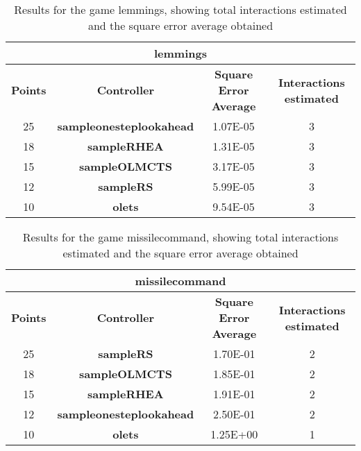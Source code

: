 \begin{table*}[!t]
\begin{center}
\begin{adjustbox}{width=1\textwidth}
\begin{tabular}{|c|c|c|c|}
\hline
\multicolumn{4}{|c|}{\textbf{lemmings}}\\
\hline
\textbf{Points} & \textbf{Controller} & \textbf{Square Error Average} & \textbf{Interactions estimated}\\
\hline
25 & \textbf{sampleonesteplookahead} & 1.07E-05 & 3
 \\
\hline
18 & \textbf{sampleRHEA} & 1.31E-05 & 3
 \\
\hline
15 & \textbf{sampleOLMCTS} & 3.17E-05 & 3
 \\
\hline
12 & \textbf{sampleRS} & 5.99E-05 & 3
 \\
\hline
10 & \textbf{olets} & 9.54E-05 & 3
 \\
\hline
\end{tabular}
\end{adjustbox}
\caption{Results for the game lemmings, showing total interactions estimated and the square error average obtained}
\label{tab:weights}
\end{center}
\end{table*}
\begin{table*}[!t]
\begin{center}
\begin{adjustbox}{width=1\textwidth}
\begin{tabular}{|c|c|c|c|}
\hline
\multicolumn{4}{|c|}{\textbf{missilecommand}}\\
\hline
\textbf{Points} & \textbf{Controller} & \textbf{Square Error Average} & \textbf{Interactions estimated}\\
\hline
25 & \textbf{sampleRS} & 1.70E-01 & 2
 \\
\hline
18 & \textbf{sampleOLMCTS} & 1.85E-01 & 2
 \\
\hline
15 & \textbf{sampleRHEA} & 1.91E-01 & 2
 \\
\hline
12 & \textbf{sampleonesteplookahead} & 2.50E-01 & 2
 \\
\hline
10 & \textbf{olets} & 1.25E+00 & 1
 \\
\hline
\end{tabular}
\end{adjustbox}
\caption{Results for the game missilecommand, showing total interactions estimated and the square error average obtained}
\label{tab:weights}
\end{center}
\end{table*}
